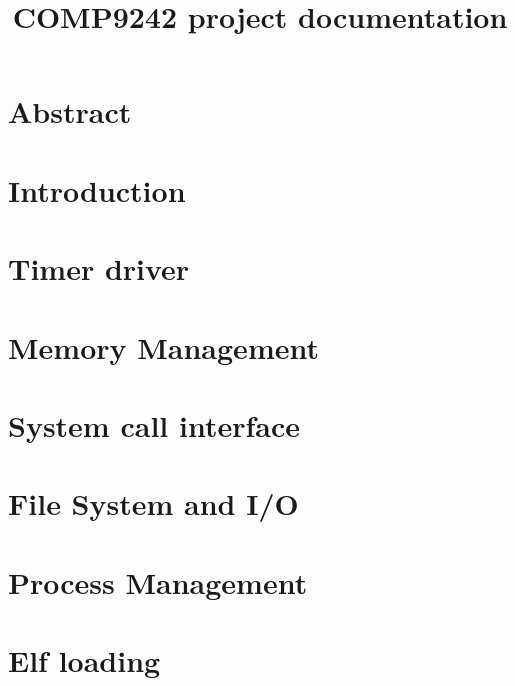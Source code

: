 \documentclass[a4paper, 11pt]{report}
\title{COMP9242 project documentation}
\begin{document}

\chapter{Abstract}
\tableofcontents
\chapter{Introduction}

\chapter{Timer driver}
\chapter{Memory Management}
\chapter{System call interface}
\chapter{File System and I/O}
\chapter{Process Management}
\chapter{Elf loading}
\end{document}
